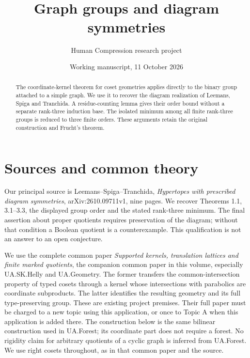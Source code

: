 \documentclass[11pt,a4paper]{article}
\title{Graph groups and diagram symmetries}
\author{Human Compression research project}
\date{Working manuscript, 11 October 2026}
\begin{document}
\maketitle
\begin{abstract}
The coordinate-kernel theorem for coset geometries applies directly to the
binary group attached to a simple graph. We use it to recover the diagram
realization of Leemans, Spiga and Tranchida. A residue-counting lemma gives
their order bound without a separate rank-three induction base. The isolated
minimum among all finite rank-three groups is reduced to three finite orders.
These arguments retain the original construction and Frucht's theorem.
\end{abstract}
\section{Sources and common theory}
Our principal source is Leemans--Spiga--Tranchida, \emph{Hypertopes with
prescribed diagram symmetries}, arXiv:2610.09711v1, nine pages. We recover
Theorems 1.1, 3.1--3.3, the displayed group order and the stated rank-three
minimum. The final assertion about proper quotients requires preservation
of the diagram; without that condition a Boolean quotient is a counterexample.
This qualification is not an answer to an open conjecture.

We use the complete common paper \emph{Supported kernels, translation lattices and finite marked quotients},
the companion common paper in this volume, especially UA.SK.Helly and UA.Geometry. The former
transfers the common-intersection property of typed cosets through a kernel
whose intersections with parabolics are coordinate subproducts. The latter
identifies the resulting geometry and its full type-preserving group. These
are existing project premises. Their full paper must be charged to a new
topic using this application, or once to Topic A when this application is
added there. The construction below is the same bilinear construction used
in UA.Forest; its coordinate part does not require a forest. No rigidity
claim for arbitrary quotients of a cyclic graph is inferred from UA.Forest.
We use right cosets throughout, as in that common paper and the source.
\end{document}
